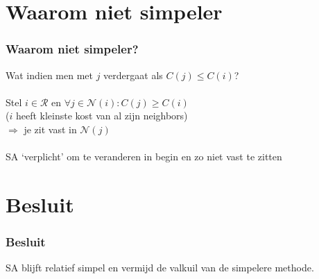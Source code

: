 \documentclass
   [kulak] %
   {kulakbeamer}
\begin{document}
\section[simpeler?]{Waarom niet simpeler}

\begin{frame}
	\frametitle{Waarom niet simpeler?}
	Wat indien men met $j$ verdergaat als $C(j) \leq C(i)$?\\~\\
	\pause
	Stel $i \in \mathscr{R}$ en $\forall j \in \mathscr{N}(i): C(j) \geqslant C(i)$ \\($i$ heeft kleinste kost van al zijn neighbors) \\
	$\Rightarrow$ je zit vast in $\mathscr{N}(j)$ \\~\\
	\pause
	SA `verplicht' om te veranderen in begin en zo niet vast te zitten
\end{frame}

\section{Besluit}
\begin{frame}
\frametitle{Besluit}
SA blijft relatief simpel en vermijd de valkuil van de simpelere methode.
\end{frame}
\end{document}
